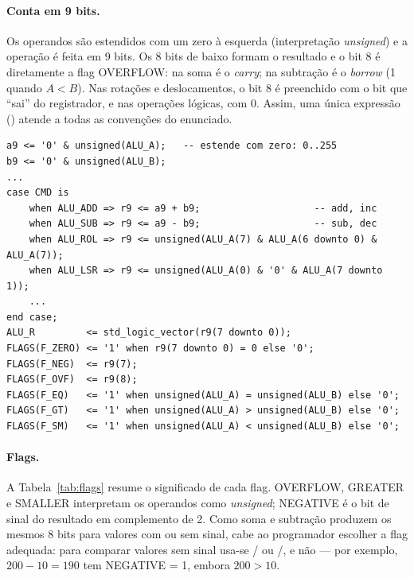 \paragraph{Conta em 9 bits.} Os operandos são estendidos com um zero à
esquerda (interpretação \emph{unsigned}) e a operação é feita em 9 bits. Os 8
bits de baixo formam o resultado e o bit 8 é diretamente a flag OVERFLOW: na
soma é o \emph{carry}; na subtração é o \emph{borrow} (1 quando $A < B$). Nas
rotações e deslocamentos, o bit 8 é preenchido com o bit que ``sai'' do
registrador, e nas operações lógicas, com 0. Assim, uma única expressão
() atende a todas as convenções do enunciado.

\begin{lstlisting}[style=vhdl, caption={Núcleo da ALU (trecho de \texttt{alu.vhd}).}]
a9 <= '0' & unsigned(ALU_A);   -- estende com zero: 0..255
b9 <= '0' & unsigned(ALU_B);
...
case CMD is
    when ALU_ADD => r9 <= a9 + b9;                    -- add, inc
    when ALU_SUB => r9 <= a9 - b9;                    -- sub, dec
    when ALU_ROL => r9 <= unsigned(ALU_A(7) & ALU_A(6 downto 0) & ALU_A(7));
    when ALU_LSR => r9 <= unsigned(ALU_A(0) & '0' & ALU_A(7 downto 1));
    ...
end case;
ALU_R         <= std_logic_vector(r9(7 downto 0));
FLAGS(F_ZERO) <= '1' when r9(7 downto 0) = 0 else '0';
FLAGS(F_NEG)  <= r9(7);
FLAGS(F_OVF)  <= r9(8);
FLAGS(F_EQ)   <= '1' when unsigned(ALU_A) = unsigned(ALU_B) else '0';
FLAGS(F_GT)   <= '1' when unsigned(ALU_A) > unsigned(ALU_B) else '0';
FLAGS(F_SM)   <= '1' when unsigned(ALU_A) < unsigned(ALU_B) else '0';
\end{lstlisting}

\paragraph{Flags.} A Tabela~\ref{tab:flags} resume o significado de cada flag.
OVERFLOW, GREATER e SMALLER interpretam os operandos como \emph{unsigned};
NEGATIVE é o bit de sinal do resultado em complemento de 2. Como soma e
subtração produzem os mesmos 8 bits para valores com ou sem sinal, cabe ao
programador escolher a flag adequada: para comparar valores sem sinal usa-se
/ ou /, e não  --- por
exemplo, $200 - 10 = 190$ tem NEGATIVE = 1, embora $200 > 10$.

